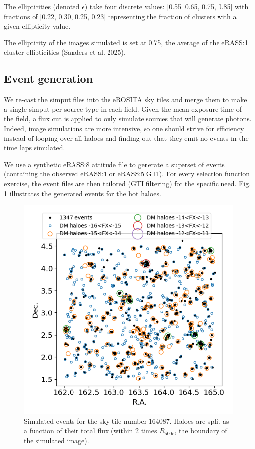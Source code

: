 \documentclass[twocolumn,iop]{openjournal}
\begin{document}
The ellipticities (denoted $\epsilon$) take four discrete values: [0.55, 0.65, 0.75, 0.85] with fractions of [0.22, 0.30, 0.25, 0.23] representing the fraction of clusters with a given ellipticity value. 


The ellipticity of the images simulated is set at 0.75, the average of the eRASS:1 cluster ellipticities (Sanders et al. 2025).

\subsection*{Event generation}

We re-cast the simput files into the eROSITA sky tiles and merge them to make a single simput per source type in each field. 
Given the mean exposure time of the field, a flux cut is applied to only simulate sources that will generate photons. 
Indeed, image simulations are more intensive, so one should strive for efficiency instead of looping over all haloes and finding out that they emit no events in the time laps simulated. 

We use a synthetic eRASS:8 attitude file to generate a superset of events (containing the observed eRASS:1 or eRASS:5 GTI). For every selection function exercise, the event files are then tailored (GTI filtering) for the specific need. 
Fig. \ref{fig:events:hotgas} illustrates the generated events for the hot haloes. 

\begin{figure}
    \centering
    \includegraphics[width=0.95\linewidth]{figures_GAS/ra-dec-hotgas-events.png}
    \caption{Simulated events for the sky tile number 164087. Haloes are split as a function of their total flux (within 2 times $R_{500c}$, the boundary of the simulated image).}
    \label{fig:events:hotgas}
\end{figure}
\end{document}
